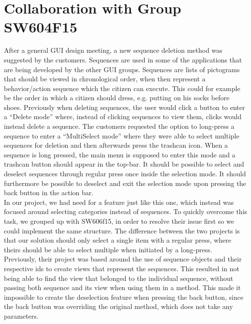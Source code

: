 \section{Collaboration with Group SW604F15}
\label{sec:collaboration_with_group_sw604f15}


After a general GUI design meeting, a new sequence deletion method was suggested by the customers. Sequences are used in some of the applications that are being developed by the other GUI groups. Sequences are lists of pictograms that should be viewed in chronological order, when then represent a behavior/action sequence which the citizen can execute. This could for example be the order in which a citizen should dress, e.g. putting on his socks before shoes. Previously when deleting sequences, the user would click a button to enter a ``Delete mode'' where, instead of clicking sequences to view them, clicks would instead delete a sequence. The customers requested the option to long-press a sequence to enter a ``MultiSelect mode'' where they were able to select multiple sequences for deletion and then afterwards press the trashcan icon. When a sequence is long pressed, the main menu is supposed to enter this mode and a trashcan button should appear in the top-bar. It should be possible to select and deselect sequences through regular press once inside the selection mode. It should furthermore be possible to deselect and exit the selection mode upon pressing the back button in the action bar.\\

In our project, we had need for a feature just like this one, which instead was focused around selecting categories instead of sequences. To quickly overcome this task, we grouped up with SW606f15, in order to resolve their issue first so we could implement the same structure. The difference between the two projects is that our solution should only select a single item with a regular press, where theirs should be able to select multiple when initiated by a long-press. \\
 
Previously, their project was based around the use of sequence objects and their respective ids to create views that represent the sequences. This resulted in not being able to find the view that belonged to the individual sequence, without passing both sequence and its view when using them in a method. This made it impossible to create the deselection feature when pressing the back button, since the back button was overriding the original  method, which does not take any parameters. \\
 

